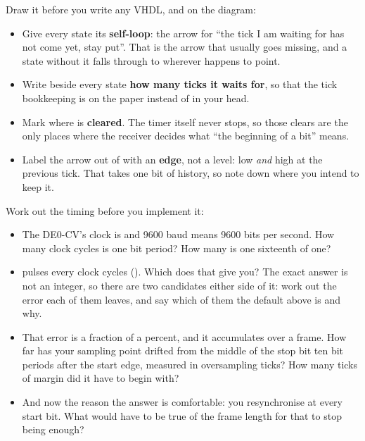 Draw it before you write any VHDL, and on the diagram:
\begin{itemize}
  \item Give every state its \textbf{self-loop}: the arrow for ``the tick I am waiting for has not
    come yet, stay put''. That is the arrow that usually goes missing, and a state without it falls
    through to wherever  happens to point.
  \item Write beside every state \textbf{how many ticks it waits for}, so that the tick bookkeeping
    is on the paper instead of in your head.
  \item Mark where  is \textbf{cleared}. The timer itself never stops, so those clears
    are the only places where the receiver decides what ``the beginning of a bit'' means.
  \item Label the arrow out of  with an \textbf{edge}, not a level: 
    low \emph{and} high at the previous tick. That takes one bit of history, so note down where you
    intend to keep it.
\end{itemize}

 Work out the timing before you implement it:
\begin{itemize}
  \item The DE0-CV's clock is  and 9600 baud means 9600 bits per second. How many clock
    cycles is one bit period? How many is one sixteenth of one?
  \item {} pulses every  clock cycles ().
    Which  does that give you? The exact answer is not an integer, so
    there are two candidates either side of it: work out the error each of them leaves, and say
    which of them the default above is and why.
  \item That error is a fraction of a percent, and it accumulates over a frame. How far has your
    sampling point drifted from the middle of the stop bit ten bit periods after the start edge,
    measured in oversampling ticks? How many ticks of margin did it have to begin with?
  \item And now the reason the answer is comfortable: you resynchronise at every start bit. What
    would have to be true of the frame length for that to stop being enough?
\end{itemize}

